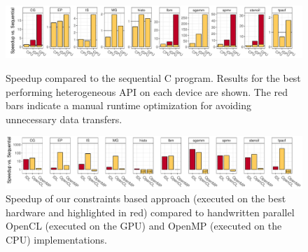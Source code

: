 \begin{figure}[t]
  \centering
  \includegraphics[width=\textwidth]{figures/asplosplots/speedup_vs_sequential_wide.pdf}
  \caption{Speedup compared to the sequential C program.
           Results for the best performing heterogeneous API on each device are shown.
           The red bars indicate a manual runtime optimization for avoiding unnecessary data transfers.}
  \label{fig:speedup-figure}
  \vspace{1.5em}
  \centering
  \includegraphics[width=\textwidth]{figures/asplosplots/comparison.pdf}
  \caption{Speedup of our constraints based approach (executed on the best hardware and highlighted in red) compared to handwritten parallel OpenCL (executed on the GPU) and OpenMP (executed on the CPU) implementations.}
  \label{fig:speedup-figure-2}
  \vspace{0.5em}
\end{figure}

\newlength{\txtwd}
\newcommand{\msb}[1]{\settowidth{\txtwd}{#1}{\scriptsize\ttfamily\bfseries \hfill\tiny #1}}
\newcommand{\ms}[1]{\settowidth{\txtwd}{#1}{\scriptsize\ttfamily \hfill\tiny #1}}

